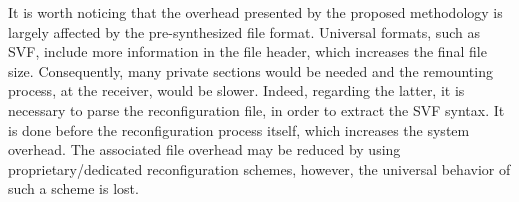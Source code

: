It is worth noticing that the overhead presented by the proposed methodology is largely affected by the pre-synthesized file format. Universal formats, such as SVF, include more information in the file header, which increases the final file size. Consequently, many private sections would be needed and the remounting process, at the receiver, would be slower. Indeed, regarding the latter, it is necessary to parse the reconfiguration file, in order to extract the SVF syntax. It is done before the reconfiguration process itself, which increases the system overhead. The associated file overhead may be reduced by using proprietary/dedicated reconfiguration schemes, however, the universal behavior of such a scheme is lost.




